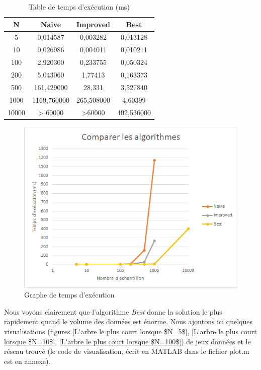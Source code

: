 \documentclass[10pt,a4paper]{article}
\begin{document}
\begin{table}[!ht]
    \begin{center}
        \begin{tabular}{ |c|c|c|c| }
            \hline
            N		&		Naive		    &		Improved		&		Best\\
            \hline
            5		&		0,014587		&		0,003282		&		0,013128\\
            \hline
            10		&		0,026986		&		0,004011		&		0,010211\\
            \hline
            100		&		2,920300		&		0,233755		&		0,050324\\
            \hline
            200		&		5,043060		&		1,77413		    &		0,163373\\
            \hline
            500		&		161,429000		&		28,331		    &		3,527840\\
            \hline
            1000	&		1169,760000		&		265,508000		&		4,60399\\
            \hline
            10000	&		> 60000   		&		>60000	 		&		402,536000\\
            \hline
        \end{tabular}
    \end{center}   
    \caption{Table de temps d'exécution (ms)}     
\end{table}

\begin{figure}[!ht]
    \centering
    \includegraphics[width=0.8\linewidth]{img/P1_time.png}
    \caption{Graphe de temps d'exécution}
\end{figure}

\clearpage

Nous voyons clairement que l'algorithme \emph{Best} donne la solution le plus rapidement quand le volume des données est énorme. Nous ajoutons ici quelques visualisations (figures \ref{L'arbre le plus court lorsque $N=5$}, \ref{L'arbre le plus court lorsque $N=10$}, \ref{L'arbre le plus court lorsque $N=100$}) de jeux données et le réseau trouvé (le code de visualisation, écrit en MATLAB dans le fichier plot.m est en annexe).
\end{document}
